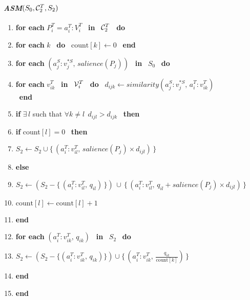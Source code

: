 \begin{figure}[p]
  \paragraph*{{\it ASM\/}$(S_0,{\cal C}^T_2,S_2)$}
      \begin{enumerate}
        \setcounter{enumi}{\thebuf}
        \renewcommand{\theenumi}{}
        \renewcommand{\labelenumi}{}
        \addtolength{\itemsep}{-\parsep}
        \setlength{\labelsep}{-4ex}
      \item {\bf for each} $P^T_i = a^T_i\!\!:\!V^T_i$ ~{\bf in}~ ${\cal C}^T_2$ ~{\bf do}
      \item \hspace*{4ex} {\bf for each} $k$ ~{\bf do}~ $\mbox{count}[k] \leftarrow 0$ ~{\bf end}
      \item \hspace*{4ex} {\bf for each} $(a^S_j\!:\!v^{*S}_j,\, salience(P_j))$ ~{\bf in}~ 
        $S_0$ ~{\bf do}
      \item \hspace*{8ex} {\bf for each} $v^T_{ik}$ ~{\bf in}~ ${\cal V}^T_i$ ~{\bf do}~
        $d_{ijk} \leftarrow similarity(a^S_j\!:\!v^{*S}_j,\,a^T_i\!\!:\!v^T_{ik})$ ~{\bf end} 
      \item \hspace*{8ex} {\bf if} $\exists\,l$ 
        such that $\forall k \neq l~~d_{ijl} > d_{ijk}$ ~{\bf then} 
      \item \hspace*{12ex} {\bf if} count$[l] = 0$ ~{\bf then}
      \item \hspace*{16ex} $S_2 \leftarrow S_2 \cup \{\,(a^T_i\!\!:\!v^T_{il},\,
        salience(P_j) \times d_{ijl})\,\}$
      \item \hspace*{12ex} {\bf else}
      \item \hspace*{16ex} $S_2 \leftarrow (S_2 - \{\,(a^T_i\!\!:\!v^T_{il},\,q_{il})\,\}) \,\cup\,
        \{\,(a^T_i\!\!:\!v^T_{il},\,q_{il} + salience(P_j) \times d_{ijl})\,\}$
      \item \hspace*{12ex} $\mbox{count}[l] \leftarrow \mbox{count}[l] + 1$
      \item \hspace*{4ex} {\bf end}
      \item \hspace*{4ex} {\bf for each} $(a^T_i\!:\!v^T_{ik},\,q_{ik})$ ~{\bf in}~ $S_2$ ~{\bf do}
      \item \hspace*{8ex} 
        $S_2 \leftarrow (S_2 - \{(a^T_i\!:\!v^T_{ik},\,q_{ik})\}) \cup
        \{\,(a^T_i\!:\!v^T_{ik},\,\displaystyle\frac{q_{ik}}{\mbox{count}[k]})\,\}$ 
      \item \hspace*{4ex} {\bf end}
      \item {\bf end}
      \end{enumerate}
  \vspace*{-\baselineskip}
  \setcounter{buf}{\theenumi}

\end{figure}
